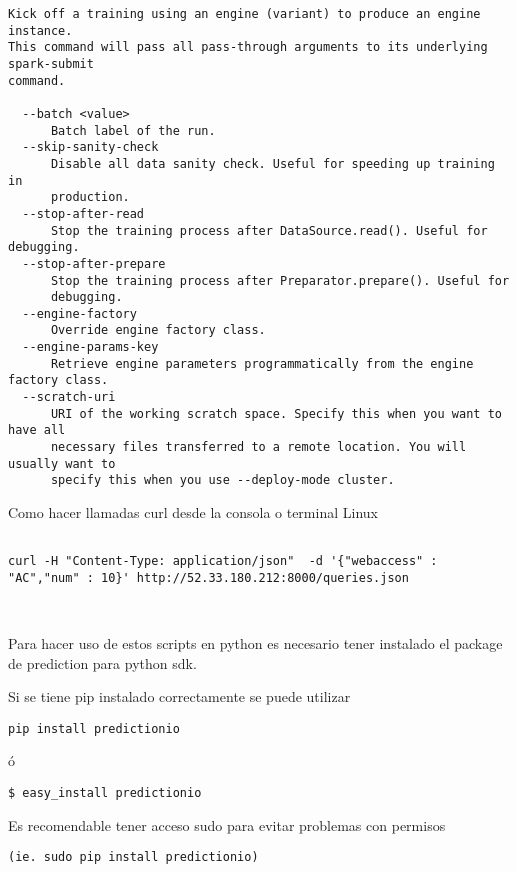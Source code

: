 \begin{lstlisting}[frame=single,basicstyle=\ttfamily\tiny,]
Kick off a training using an engine (variant) to produce an engine instance.
This command will pass all pass-through arguments to its underlying spark-submit
command.

  --batch <value>
      Batch label of the run.
  --skip-sanity-check
      Disable all data sanity check. Useful for speeding up training in
      production.
  --stop-after-read
      Stop the training process after DataSource.read(). Useful for debugging.
  --stop-after-prepare
      Stop the training process after Preparator.prepare(). Useful for
      debugging.
  --engine-factory
      Override engine factory class.
  --engine-params-key
      Retrieve engine parameters programmatically from the engine factory class.
  --scratch-uri
      URI of the working scratch space. Specify this when you want to have all
      necessary files transferred to a remote location. You will usually want to
      specify this when you use --deploy-mode cluster.

\end{lstlisting}

\vspace{1cm}

Como hacer llamadas curl desde la consola o terminal Linux


\begin{lstlisting}

curl -H "Content-Type: application/json"  -d '{"webaccess" : "AC","num" : 10}' http://52.33.180.212:8000/queries.json



\end{lstlisting}





Para hacer uso de estos scripts en python es necesario tener instalado el package de prediction para python sdk.

Si se tiene pip instalado correctamente se puede utilizar

\begin{verbatim}
pip install predictionio
\end{verbatim}

ó

\begin{verbatim}
$ easy_install predictionio
\end{verbatim}


Es recomendable tener acceso sudo para evitar problemas con permisos

\begin{verbatim}
(ie. sudo pip install predictionio)
\end{verbatim}


